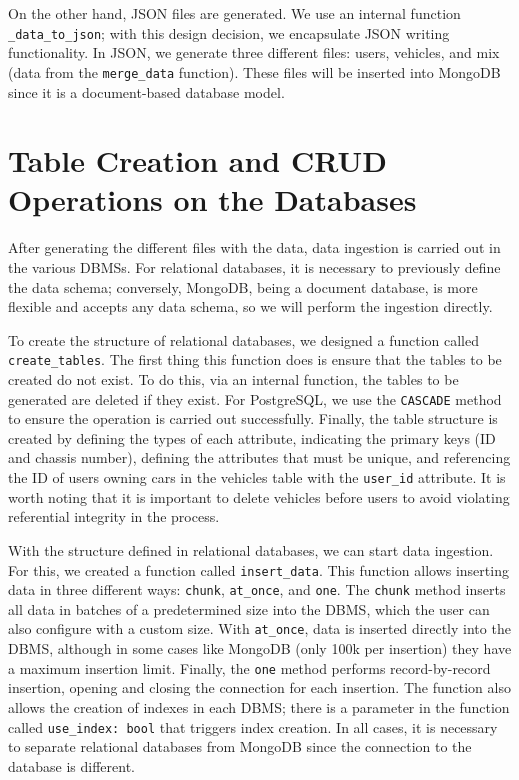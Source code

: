 \documentclass[11pt,a4paper]{article}
\begin{document}
On the other hand, JSON files are generated. We use an internal function \texttt{\_data\_to\_json}; with this design decision, we encapsulate JSON writing functionality. In JSON, we generate three different files: users, vehicles, and mix (data from the \texttt{merge\_data} function). These files will be inserted into MongoDB since it is a document-based database model.

\section{Table Creation and CRUD Operations on the Databases}
After generating the different files with the data, data ingestion is carried out in the various DBMSs. For relational databases, it is necessary to previously define the data schema; conversely, MongoDB, being a document database, is more flexible and accepts any data schema, so we will perform the ingestion directly.

To create the structure of relational databases, we designed a function called \texttt{create\_tables}. The first thing this function does is ensure that the tables to be created do not exist. To do this, via an internal function, the tables to be generated are deleted if they exist. For PostgreSQL, we use the \texttt{CASCADE} method to ensure the operation is carried out successfully. Finally, the table structure is created by defining the types of each attribute, indicating the primary keys (ID and chassis number), defining the attributes that must be unique, and referencing the ID of users owning cars in the vehicles table with the \texttt{user\_id} attribute. It is worth noting that it is important to delete vehicles before users to avoid violating referential integrity in the process.

With the structure defined in relational databases, we can start data ingestion. For this, we created a function called \texttt{insert\_data}. This function allows inserting data in three different ways: \texttt{chunk}, \texttt{at\_once}, and \texttt{one}. The \texttt{chunk} method inserts all data in batches of a predetermined size into the DBMS, which the user can also configure with a custom size. With \texttt{at\_once}, data is inserted directly into the DBMS, although in some cases like MongoDB (only 100k per insertion) they have a maximum insertion limit. Finally, the \texttt{one} method performs record-by-record insertion, opening and closing the connection for each insertion. The function also allows the creation of indexes in each DBMS; there is a parameter in the function called \texttt{use\_index: bool} that triggers index creation. In all cases, it is necessary to separate relational databases from MongoDB since the connection to the database is different.
\end{document}
